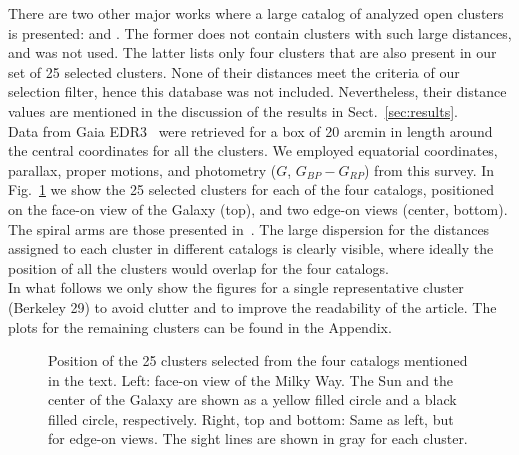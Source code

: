 \documentclass{aa}
\begin{document}
 There are two other major works where a large catalog of analyzed open clusters
 is presented: \cite{Lui_2019} and \cite{Dias_2021}. The former does not contain
 clusters with such large distances, and was not used. The latter lists
 only four clusters that are also present in our set of 25  selected
 clusters. None of their distances meet the criteria of  our selection filter, hence this
 database was not included. Nevertheless, their distance values are
 mentioned in the discussion of the results in Sect.~\ref{sec:results}.\\

 Data from Gaia EDR3~\citep{Gaia_2016,Gaia_EDR3} were retrieved for a box of 20
 arcmin in length around the central coordinates for all the clusters. We
 employed equatorial coordinates, parallax, proper motions, and photometry
 ($G$, $G_{BP}-G_{RP}$) from this survey.
 In Fig.~\ref{fig:MWmap} we show the 25 selected clusters for each of
 the four catalogs, positioned on the face-on view of the Galaxy (top), and
 two edge-on views (center, bottom). The spiral arms are those presented
 in~\cite{Momany_2006}. The large dispersion for the distances
 assigned to each cluster in different catalogs is clearly visible, where
 ideally the position of all the clusters would overlap for the four catalogs.\\

 In what follows we  only show the figures for a single representative
 cluster (Berkeley 29) to avoid  clutter and to improve the readability of the
 article. The plots for the remaining clusters can be found in the Appendix.

 \begin{figure}
  \caption{Position of the 25 clusters selected from the four
    catalogs mentioned in the text.
    Left: face-on view of the Milky Way. The Sun and the center of the Galaxy
    are shown as  a yellow filled circle and a  black filled circle,
    respectively. Right, top and bottom: Same as left, but for edge-on views.
    The sight lines are shown in gray for each cluster.}
  \label{fig:MWmap}
 \end{figure}
\end{document}
